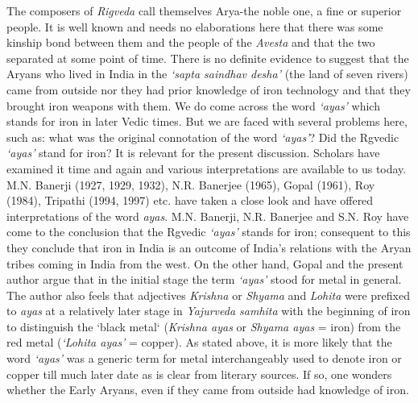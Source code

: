 \vspace{-.2cm}

The composers of \textit{Rigveda} call themselves Arya-the noble one, a fine or superior people. It is well known and needs no elaborations here that there was some kinship bond between them and the people of the \textit{Avesta} and that the two separated at some point of time. There is no definite evidence to suggest that the Aryans who lived in India in the \textit{‘sapta saindhav desha’} (the land of seven rivers) came from outside nor they had prior knowledge of iron technology and that they brought iron weapons with them. We do come across the word \textit{‘ayas’} which stands for iron in later Vedic times. But we are faced with several problems here, such as: what was the original connotation of the word \textit{‘ayas’}? Did the Rgvedic \textit{‘ayas’} stand for iron? It is relevant for the present discussion. Scholars have examined it time and again and various interpretations are available to us today. M.N. Banerji (1927, 1929, 1932), N.R. Banerjee (1965), Gopal (1961), Roy (1984), Tripathi (1994, 1997) etc. have taken a close look and have offered interpretations of the word \textit{ayas}. M.N. Banerji, N.R. Banerjee and S.N. Roy have come to the conclusion that the Rgvedic \textit{‘ayas’} stands for iron; consequent to this they conclude that iron in India is an outcome of India’s relations with the Aryan tribes coming in India from the west. On the other hand, Gopal and the present author argue that in the initial stage the term \textit{‘ayas’} stood for metal in general. The author also feels that adjectives \textit{Krishna}  or \textit{Shyama} and \textit{Lohita} were prefixed to \textit{ayas} at a relatively later stage in \textit{Yajurveda samhita} with the beginning of iron to distinguish the `black metal` (\textit{Krishna ayas} or \textit{Shyama ayas} = iron) from the red metal (\textit{‘Lohita ayas'} = copper). As stated above, it is more likely that the word \textit{‘ayas’} was a generic term for metal interchangeably used to denote iron or copper till much later date as is clear from literary sources. If so, one wonders whether the Early Aryans, even if they came from outside had knowledge of iron.


